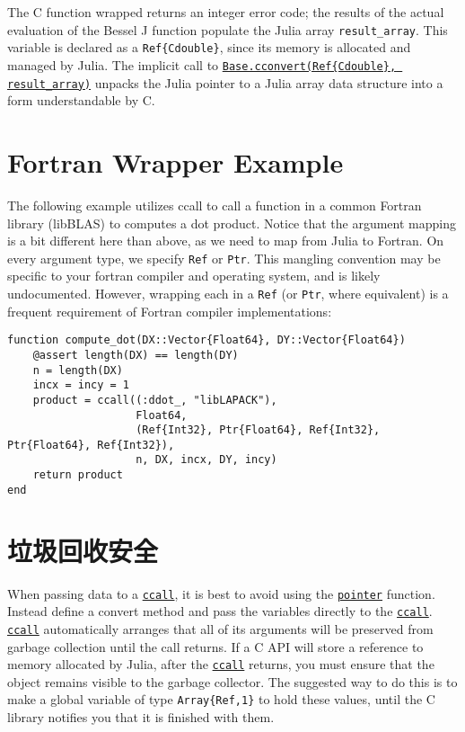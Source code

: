 The C function wrapped returns an integer error code; the results of the actual evaluation of the Bessel J function populate the Julia array \texttt{result\_array}. This variable is declared as a \texttt{Ref\{Cdouble\}}, since its memory is allocated and managed by Julia. The implicit call to \hyperlink{16487788729383051927}{\texttt{Base.cconvert(Ref\{Cdouble\}, result\_array)}} unpacks the Julia pointer to a Julia array data structure into a form understandable by C.



\hypertarget{17069829158327603815}{}


\section{Fortran Wrapper Example}



The following example utilizes ccall to call a function in a common Fortran library (libBLAS) to computes a dot product. Notice that the argument mapping is a bit different here than above, as we need to map from Julia to Fortran.  On every argument type, we specify \texttt{Ref} or \texttt{Ptr}. This mangling convention may be specific to your fortran compiler and operating system, and is likely undocumented. However, wrapping each in a \texttt{Ref} (or \texttt{Ptr}, where equivalent) is a frequent requirement of Fortran compiler implementations:




\begin{verbatim}
function compute_dot(DX::Vector{Float64}, DY::Vector{Float64})
    @assert length(DX) == length(DY)
    n = length(DX)
    incx = incy = 1
    product = ccall((:ddot_, "libLAPACK"),
                    Float64,
                    (Ref{Int32}, Ptr{Float64}, Ref{Int32}, Ptr{Float64}, Ref{Int32}),
                    n, DX, incx, DY, incy)
    return product
end
\end{verbatim}



\hypertarget{6047327473342163880}{}


\section{垃圾回收安全}



When passing data to a \hyperlink{14245046751182637566}{\texttt{ccall}}, it is best to avoid using the \hyperlink{8901246211940014300}{\texttt{pointer}} function. Instead define a convert method and pass the variables directly to the \hyperlink{14245046751182637566}{\texttt{ccall}}. \hyperlink{14245046751182637566}{\texttt{ccall}} automatically arranges that all of its arguments will be preserved from garbage collection until the call returns. If a C API will store a reference to memory allocated by Julia, after the \hyperlink{14245046751182637566}{\texttt{ccall}} returns, you must ensure that the object remains visible to the garbage collector. The suggested way to do this is to make a global variable of type \texttt{Array\{Ref,1\}} to hold these values, until the C library notifies you that it is finished with them.



